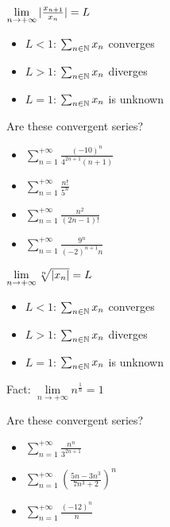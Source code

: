 \begin{property}
	$\lim\limits_{n \to +\infty} | \frac{x_{n+1}}{x_n} |=L$
	\begin{itemize}
		\item $L<1$: $\sum_{n \in \mathbb{N}}x_n$ converges
		\item $L>1$: $\sum_{n \in \mathbb{N}}x_n$ diverges
		\item $L=1$: $\sum_{n \in \mathbb{N}}x_n$ is unknown
	\end{itemize}
\end{property}
\begin{question}
	Are these convergent series?
	\begin{itemize}
		\item $\sum_{n=1}^{+\infty}\frac{(-10)^n}{4^{2n+1}(n+1)}$
		\item $\sum_{n=1}^{+\infty}\frac{n!}{5^n}$
		\item $\sum_{n=1}^{+\infty}\frac{n^2}{(2n-1)!}$
		\item $\sum_{n=1}^{+\infty}\frac{9^n}{(-2)^{n+1}n}$
	\end{itemize}
\end{question}


\begin{property}
	$\lim\limits_{n \to +\infty} \sqrt[n]{| x_n |}=L$
	\begin{itemize}
		\item $L<1$: $\sum_{n \in \mathbb{N}}x_n$ converges
		\item $L>1$: $\sum_{n \in \mathbb{N}}x_n$ diverges
		\item $L=1$: $\sum_{n \in \mathbb{N}}x_n$ is unknown
	\end{itemize}
\end{property}
Fact: $\lim\limits_{n \to +\infty} n^{\frac{1}{n}}=1$
\begin{question}
	Are these convergent series?
	\begin{itemize}
		\item $\sum_{n=1}^{+\infty}\frac{n^n}{3^{2n+1}}$
		\item $\sum_{n=1}^{+\infty}\left( \frac{5n-3n^3}{7n^3+2} \right)^n$
		\item $\sum_{n=1}^{+\infty}\frac{(-12)^n}{n}$
	\end{itemize}
\end{question}


